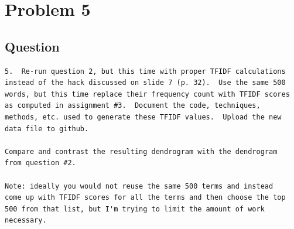\section{Problem 5}
\label{part5}
\subsection*{Question}
\begingroup
\begin{verbatim}
5.  Re-run question 2, but this time with proper TFIDF calculations
instead of the hack discussed on slide 7 (p. 32).  Use the same 500
words, but this time replace their frequency count with TFIDF scores
as computed in assignment #3.  Document the code, techniques,
methods, etc. used to generate these TFIDF values.  Upload the new
data file to github.

Compare and contrast the resulting dendrogram with the dendrogram
from question #2.

Note: ideally you would not reuse the same 500 terms and instead
come up with TFIDF scores for all the terms and then choose the top
500 from that list, but I'm trying to limit the amount of work
necessary.
\end{verbatim}
